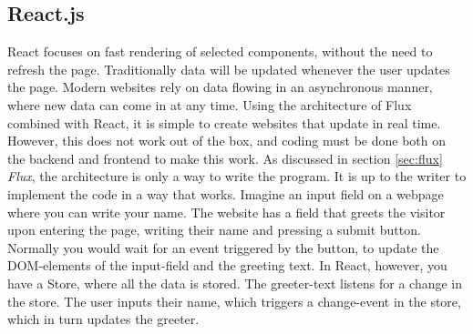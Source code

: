 \subsection{React.js}

React focuses on fast rendering of selected components, without the need to refresh the page. Traditionally data will be updated whenever the user updates the page. Modern websites rely on data flowing in an asynchronous manner, where new data can come in at any time. Using the architecture of Flux combined with React, it is simple to create websites that update in real time. However, this does not work out of the box, and coding must be done both on the backend and frontend to make this work. As discussed in section \ref{sec:flux} \emph{Flux}, the architecture is only a way to write the program. It is up to the writer to implement the code in a way that works. Imagine an input field on a webpage where you can write your name. The website has a field that greets the visitor upon entering the page, writing their name and pressing a submit button. Normally you would wait for an event triggered by the button, to update the DOM-elements of the input-field and the greeting text. In React, however, you have a Store, where all the data is stored. The greeter-text listens for a change in the store. The user inputs their name, which triggers a change-event in the store, which in turn updates the greeter.


